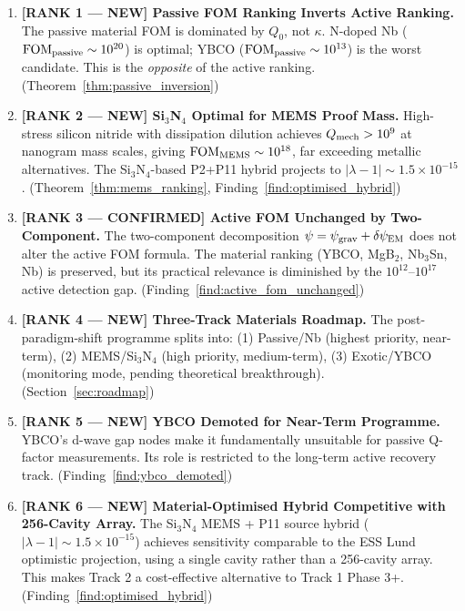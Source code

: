 \documentclass[11pt]{article}
\theoremstyle{definition}
\theoremstyle{remark}
\newcommand{\ee}[1]{\times 10^{#1}}
\newcommand{\psigrav}{\psi_{\rm grav}}
\newcommand{\psiEM}{\delta\psi_{\rm EM}}
\newcommand{\FOMpassive}{\mathrm{FOM}_{\rm passive}}
\newcommand{\FOMMEMS}{\mathrm{FOM}_{\rm MEMS}}
\newcommand{\lam}{|\lambda-1|}
\begin{document}
\begin{enumerate}
  \item \textbf{[RANK 1 --- NEW] Passive FOM Ranking Inverts Active Ranking.}
    The passive material FOM is dominated by $Q_0$, not $\kappa$. N-doped
    Nb ($\FOMpassive \sim 10^{20}$) is optimal; YBCO ($\FOMpassive \sim 10^{13}$)
    is the worst candidate. This is the \emph{opposite} of the active ranking.
    (Theorem~\ref{thm:passive_inversion})

  \item \textbf{[RANK 2 --- NEW] Si$_3$N$_4$ Optimal for MEMS Proof Mass.}
    High-stress silicon nitride with dissipation dilution achieves
    $Q_{\rm mech} > 10^9$ at nanogram mass scales, giving $\FOMMEMS \sim 10^{18}$,
    far exceeding metallic alternatives. The Si$_3$N$_4$-based P2+P11 hybrid
    projects to $\lam \sim 1.5\ee{-15}$. (Theorem~\ref{thm:mems_ranking},
    Finding~\ref{find:optimised_hybrid})

  \item \textbf{[RANK 3 --- CONFIRMED] Active FOM Unchanged by Two-Component.}
    The two-component decomposition $\psi = \psigrav + \psiEM$ does not
    alter the active FOM formula. The material ranking (YBCO, MgB$_2$,
    Nb$_3$Sn, Nb) is preserved, but its practical relevance is diminished
    by the $10^{12}$--$10^{17}$ active detection gap.
    (Finding~\ref{find:active_fom_unchanged})

  \item \textbf{[RANK 4 --- NEW] Three-Track Materials Roadmap.}
    The post-paradigm-shift programme splits into: (1) Passive/Nb
    (highest priority, near-term), (2) MEMS/Si$_3$N$_4$ (high priority,
    medium-term), (3) Exotic/YBCO (monitoring mode, pending theoretical
    breakthrough). (Section~\ref{sec:roadmap})

  \item \textbf{[RANK 5 --- NEW] YBCO Demoted for Near-Term Programme.}
    YBCO's d-wave gap nodes make it fundamentally unsuitable for passive
    Q-factor measurements. Its role is restricted to the long-term active
    recovery track. (Finding~\ref{find:ybco_demoted})

  \item \textbf{[RANK 6 --- NEW] Material-Optimised Hybrid Competitive with
    256-Cavity Array.}
    The Si$_3$N$_4$ MEMS + P11 source hybrid ($\lam \sim 1.5\ee{-15}$)
    achieves sensitivity comparable to the ESS Lund optimistic projection,
    using a single cavity rather than a 256-cavity array. This makes
    Track 2 a cost-effective alternative to Track 1 Phase 3+.
    (Finding~\ref{find:optimised_hybrid})
\end{enumerate}
\end{document}
